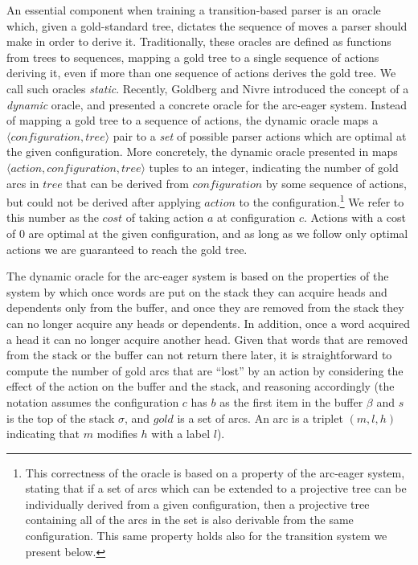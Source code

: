 \documentclass[11pt,letterpaper]{article}
\newcommand{\tuple}[1]{$\langle#1\rangle$}
\begin{document}
An essential component when training a transition-based parser is an oracle
which, given a gold-standard tree, dictates the sequence of moves a parser
should make in order to derive it.  Traditionally, these oracles are defined
as functions from trees to sequences, mapping a gold tree to a single sequence
of actions deriving it, even if more than one sequence of actions derives the
gold tree. We call such oracles \emph{static}.  Recently, Goldberg and Nivre
 introduced the concept of a \emph{dynamic} oracle, and
presented a concrete oracle for the arc-eager system.  Instead of mapping a
gold tree to a sequence of actions, the dynamic oracle maps a
\tuple{configuration, tree} pair to a \emph{set} of possible parser actions
which are optimal at the given configuration.  More concretely, the dynamic
oracle presented in \cite{coling2012} maps \tuple{action,configuration,tree}
tuples to an integer, indicating the number of gold arcs in $tree$ that can be
derived from $configuration$ by some sequence of actions, but could not be derived
after applying $action$ to the configuration.\footnote{This correctness of
the oracle is based on a property of the arc-eager system, stating that if a
set of arcs which can be extended to a projective tree can be individually
derived from a given configuration, then a projective tree containing all of
the arcs in the set is also derivable from the same configuration.  This same
property holds also for the transition system we present below.} We refer to
this number as the $cost$ of taking action $a$ at configuration $c$. Actions
with a cost of 0 are optimal at the given configuration, and as long as we
follow only optimal actions we are guaranteed to reach the gold tree.

The dynamic oracle for the arc-eager system is based on the properties of the
system by which once words are put on the stack they can acquire heads and
dependents only from the buffer, and once they are removed from the stack they
can no longer acquire any heads or dependents. In addition, once a word
acquired a head it can no longer acquire another head.  Given that words that
are removed from the stack or the buffer can not return there later, it
is straightforward to compute the number of gold arcs that are ``lost'' by an
action by considering the effect of the action on the buffer and the stack,
and reasoning accordingly (the notation assumes the configuration $c$ has $b$
as the first item in the buffer $\beta$ and $s$ is the top of the stack
$\sigma$, and $gold$ is a set of arcs. An arc is a triplet $(m,l,h)$ %
indicating that $m$ modifies $h$ with a label $l$).
\end{document}
